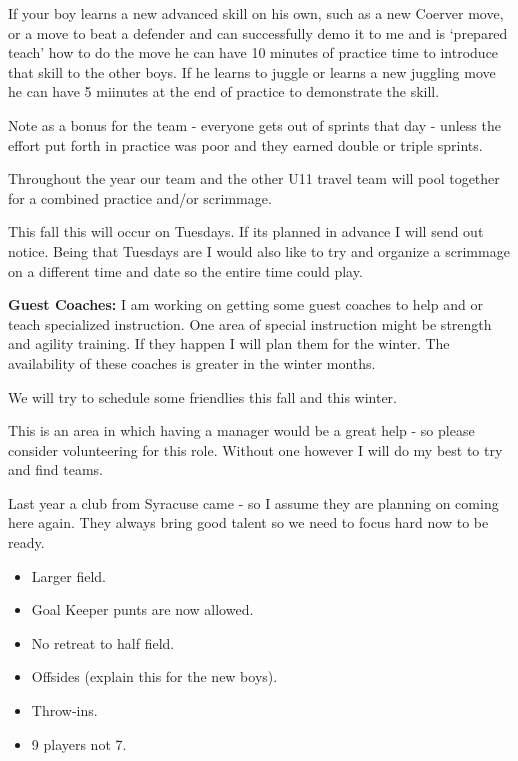 \documentclass[10pt,letterpaper]{article}
\newenvironment{agendablock}[1]{%
    \tcolorbox[beamer,%
    noparskip,breakable,
    colback=LightGray,colframe=Black,%
    colbacklower=Gray!75!LightGray,%
    title=#1]}%
    {\endtcolorbox}
\newenvironment{evenBlock}[1]{%
    \tcolorbox[beamer,%
    noparskip,breakable,
    colback=LightGreen,colframe=DarkGreen,%
    colbacklower=LimeGreen!75!LightGreen,%
    title=#1]}%
    {\endtcolorbox}
\begin{document}
\begin{agendablock}{Skill Building Encouragement and Leadership}
If your boy learns a new advanced skill on his own, such as a new Coerver move, or a move to beat a defender and can successfully demo it to me and is `prepared teach' how to do the move he can have 10 minutes of practice time to introduce that skill to the other boys.  If he learns to juggle or learns a new juggling move he can have 5 miinutes at the end of practice to demonstrate the skill.

Note as a bonus for the team - everyone gets out of sprints that day - unless the effort put forth in practice was poor and they earned double or triple sprints.
\end{agendablock}

\begin{agendablock}{Practice Variations}
Throughout the year our team and the other U11 travel team will pool together for a combined practice and/or scrimmage.

This fall this will occur on Tuesdays.  If its planned in advance I will send out notice.  Being that Tuesdays are I would also like to try and organize a scrimmage on a different time and date so the entire time could play.

\textbf{Guest Coaches:}
I am working on getting some guest coaches to help and or teach specialized instruction.  One area of special instruction might be strength and agility training.  If they happen I will plan them for the winter.  The availability of these coaches is greater in the winter months.
\end{agendablock}

\begin{agendablock}{Friendly Scrimmages}
We will try to schedule some friendlies this fall and this winter.

This is an area in which having a manager would be a great help - so please consider volunteering for this role.
Without one however I will do my best to try and find teams.

Last year a club from Syracuse came - so I assume they are planning on coming here again.  They always bring good talent so we need to focus hard now to be ready.
\end{agendablock}

\begin{evenBlock}{U10 vs U11 Rule Changes}
    \begin{itemize}
        \item Larger field.
        \item Goal Keeper punts are now allowed.
        \item No retreat to half field.
        \item Offsides (explain this for the new boys).
        \item Throw-ins.
        \item 9 players not 7.
    \end{itemize}
\end{evenBlock}
\end{document}
